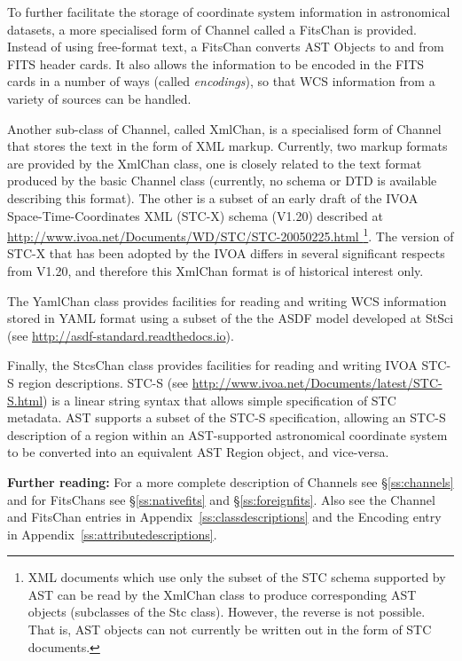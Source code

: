 \documentclass[twoside,11pt]{starlink}
\providecommand{\appref}[1]{Appendix~\ref{#1}}
\providecommand{\secref}[1]{\S\ref{#1}}
\begin{document}
To further facilitate the storage of coordinate system information in
astronomical datasets, a more specialised form of Channel called a
FitsChan is provided. Instead of using free-format text, a FitsChan
converts AST Objects to and from FITS header cards. It also allows the
information to be encoded in the FITS cards in a number of ways
(called \emph{encodings}), so that WCS information from a variety of
sources can be handled.

Another sub-class of Channel, called XmlChan, is a specialised form of
Channel that stores the text in the form of XML markup. Currently, two
markup formats are provided by the XmlChan class, one is closely related
to the text format produced by the basic Channel class (currently, no
schema or DTD is available describing this format). The other is a subset
of an early draft of the IVOA Space-Time-Coordinates XML (STC-X) schema
(V1.20) described at
\url{http://www.ivoa.net/Documents/WD/STC/STC-20050225.html
}\footnote{XML documents which use only the subset of the STC schema
supported by AST can be read by the XmlChan class to produce
corresponding AST objects (subclasses of the Stc class). However, the
reverse is not possible. That is, AST objects can not currently be
written out in the form of STC documents.}. The version of STC-X that has
been adopted by the IVOA differs in several significant respects from
V1.20, and therefore this XmlChan format is of historical interest only.

The YamlChan class provides facilities for reading and writing WCS
information stored in YAML format using a subset of the the ASDF model
developed at StSci (see \url{http://asdf-standard.readthedocs.io}).

Finally, the StcsChan class provides facilities for reading and writing
IVOA STC-S region descriptions. STC-S (see
\url{http://www.ivoa.net/Documents/latest/STC-S.html}) is a linear string
syntax that allows simple specification of STC metadata. AST supports a
subset of the STC-S specification, allowing an STC-S description of a
region within an AST-supported astronomical coordinate system to be converted
into an equivalent AST Region object, and vice-versa.

\textbf{Further reading:} For a more complete description of Channels
see \secref{ss:channels} and for FitsChans see \secref{ss:nativefits}
and \secref{ss:foreignfits}. Also see the Channel and FitsChan entries
in \appref{ss:classdescriptions} and the Encoding entry in
\appref{ss:attributedescriptions}.
\end{document}
